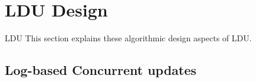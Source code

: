 \section{LDU Design}



LDU 
This section explains these algorithmic design aspects of LDU.

\subsection{Log-based Concurrent updates}




